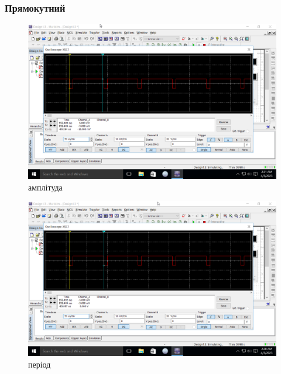 \documentclass[a4paper, 12pt, oneside]{extarticle}
\begin{document}
\subsubsection*{Прямокутний}
\begin{figure}[ht]
	\centering
	\includegraphics[width=.9\textwidth]{rec2}
	\caption{амплітуда}
\end{figure}
\begin{figure}[t]
	\centering
	\includegraphics[width=.9\textwidth]{rec1}
	\caption{період}
\end{figure}
\clearpage
\end{document}
